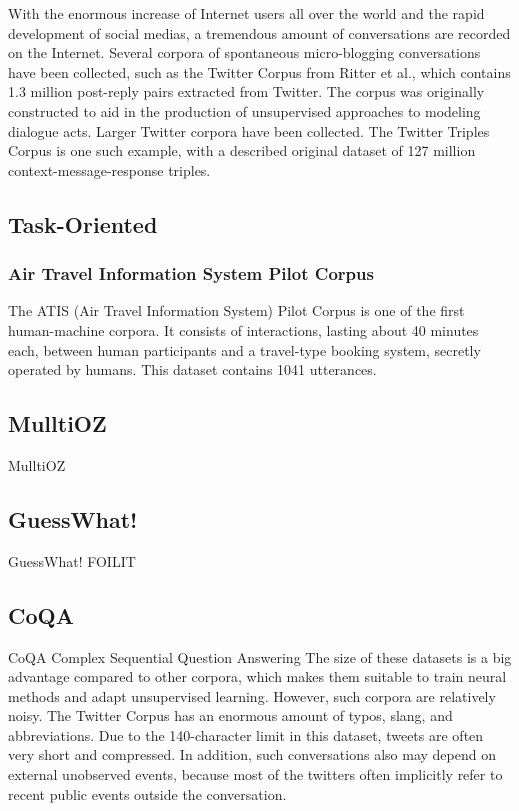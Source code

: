 \documentclass[bsc,frontabs,twoside,singlespacing,parskip,deptreport]{infthesis}     %
\begin{document}
With the enormous increase of Internet users all over the world and the rapid development of social medias, a tremendous amount of conversations are recorded on the Internet. Several corpora of spontaneous micro-blogging conversations have been collected, such as the 
Twitter Corpus from Ritter et al.\cite{ritter2010unsupervised}, which contains 1.3 million post-reply pairs extracted from Twitter. The corpus was originally constructed to aid in the production of unsupervised approaches to modeling dialogue acts. Larger Twitter corpora have been collected. The Twitter Triples Corpus\cite{sordoni2015neural} is one such example, with a described original dataset of 127 million context-message-response triples.

\subsection{Task-Oriented}



\subsubsection{Air Travel Information System Pilot Corpus}

The ATIS (Air Travel Information System) Pilot Corpus\cite{hemphill1990atis} is one of the first human-machine corpora. It consists of interactions, lasting about 40 minutes each, between human participants and a travel-type booking system, secretly operated by humans. This dataset contains 1041 utterances.

\subsection{MulltiOZ}

MulltiOZ

\subsection{GuessWhat!}
GuessWhat!
FOILIT

\subsection{CoQA}
CoQA
Complex Sequential Question Answering\cite{saha2018complex}
The size of these datasets is a big advantage compared to other corpora, which makes them suitable to train neural methods and adapt unsupervised learning. However, such corpora are relatively noisy. The Twitter Corpus has an enormous amount of typos, slang, and abbreviations. Due to the 140-character limit in this dataset, tweets are often very short and compressed. In addition, such conversations also may depend on external unobserved events, because most of the twitters often implicitly refer to recent public events outside the conversation.
\end{document}
